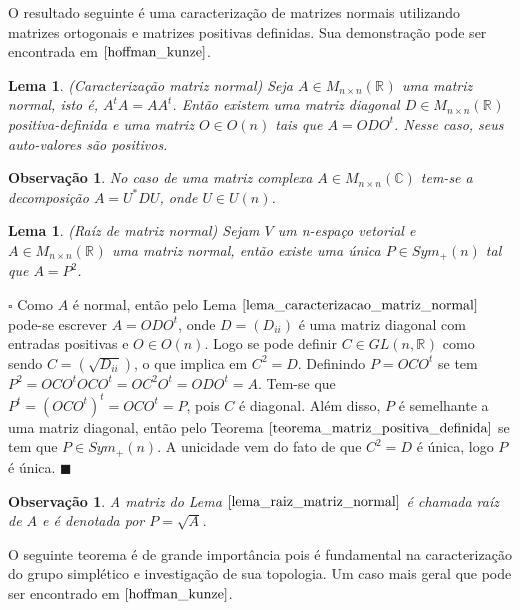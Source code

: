 \documentclass[12pt]{book}
\newtheorem{lema}[teorema]{Lema}
\newtheorem{observacao}[teorema]{Observação}
\newenvironment{prova}[1]{$\square$ #1}{\hfill$\blacksquare$}
\newcommand{\generalgroup}[2]{GL(#1, #2)}
\newcommand{\generalgroupreal}[1]{\generalgroup{#1}{\real{}}}
\newcommand{\matrizortogonal}[1]{O(#1)}
\newcommand{\matrizquadreal}[1]{M_{#1 \times #1}(\real{})}
\newcommand{\matrizsimetricapositiva}[1]{Sym_{+}(#1)}
\newcommand{\matrizunitaria}[1]{U(#1)}
\newcommand{\real}[1]{\mathbb{R}^{#1}}
\begin{document}
	O resultado seguinte é uma caracterização de matrizes normais  utilizando matrizes ortogonais e matrizes positivas definidas. Sua demonstração pode ser encontrada em $\cite{hoffman_kunze}$.
	
	\begin{lema}\label{lema_caracterizacao_matriz_normal}
		(Caracterização matriz normal) Seja $A\in \matrizquadreal{n}$ uma matriz normal, isto é, $A^{t}A=AA^{t}$. Então existem uma matriz diagonal $D \in \matrizquadreal{n}$ positiva-definida e uma matriz $O\in \matrizortogonal{n}$ tais que $A=ODO^{t}$. Nesse caso, seus auto-valores são positivos. 
	\end{lema}
	
	\begin{observacao}\label{observacao_caracterizacao_matriz_normal}
		No caso de uma matriz complexa $A \in M_{n\times n}(\mathbb{C})$ tem-se a decomposição $A=U^{*}DU$, onde $U \in \matrizunitaria{n}$.
	\end{observacao}
	
	\begin{lema}\label{lema_raiz_matriz_normal}
		(Raíz de matriz normal) Sejam $V$ um n-espaço vetorial e $A\in \matrizquadreal{n}$ uma matriz normal, então existe uma única $P\in \matrizsimetricapositiva{n}$ tal que $A=P^{2}$. 
	\end{lema}
	\begin{prova}
		Como $A$ é normal, então pelo Lema $\ref{lema_caracterizacao_matriz_normal}$ pode-se escrever $A=ODO^{t}$, onde $D=(D_{ii})$ é uma matriz diagonal com entradas positivas e $O\in \matrizortogonal{n}$. Logo se pode definir $C \in \generalgroupreal{n}$ como sendo $C = (\sqrt{D_{ii}})$, o que implica em $C^{2} = D$. Definindo $P = OCO^{t}$ se tem $P^{2} = OCO^{t}OCO^{t} = OC^{2}O^{t} = ODO^{t}=A$. Tem-se que $P^{t} = (OCO^{t})^{t} = OCO^{t} = P$, pois $C$ é diagonal. Além disso, $P$ é semelhante a uma matriz diagonal, então pelo Teorema $\ref{teorema_matriz_positiva_definida}$ se tem que $P \in \matrizsimetricapositiva{n}$. A unicidade vem do fato de que $C^{2} = D$ é única, logo $P$ é única.
	\end{prova}
	
	\begin{observacao}\label{observacao_raiz_matriz_normal}
		A matriz do Lema $\ref{lema_raiz_matriz_normal}$ é chamada raíz de $A$ e é denotada por $P=\sqrt{A}$.
	\end{observacao}
	
	O seguinte teorema é de grande importância pois é fundamental na caracterização do grupo simplético e investigação de sua topologia. Um caso mais geral que pode ser encontrado em $\cite{hoffman_kunze}$.
	
\end{document}
